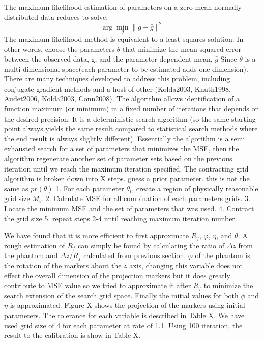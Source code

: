 The maximum-likelihood estimation of parameters on a zero mean normally distributed data reduces to solve:
\begin{equation}
\arg\min_{\theta} \| g - \bar{g} \|^2
\end{equation}
The  maximum-likelihood method is equivalent to a least-squares solution.
In other words, choose the parameters $\theta$ that minimize the mean-squared error between the observed data, g, and the parameter-dependent mean, $\bar{g}$
Since $\theta$ is a multi-dimensional space(each parameter to be estimated adds one dimension).  There are many techniques developed to address this problem, including conjugate gradient methods and a host of other (Kolda2003, Knuth1998, Audet2006, Kolda2003, Conn2008).  The algorithm allows identification of a function maximum (or minimum) in a fixed number of iterations that depends on the desired precision.  It is a deterministic search algorithm (so the same starting point always yields the same result compared to statistical search methods where the end result is always slightly different).  Essentially the algorithm is a semi exhausted search for a set of parameters that minimizes the MSE, then the algorithm regenerate another set of parameter sets based on the previous iteration until we reach the maximum iteration specified. The contracting grid algorithm is broken down into X steps.
guess a prior parameter. this is not the same as $pr(\theta)$
1. For each parameter $\theta_i$, create  a region of physically reasonable grid size $M_i$.
2. Calculate MSE for all combination of each parameters grids.
3. Locate the minimum MSE and the set of parameters that was used.
4. Contract the grid size
5. repeat steps 2-4 until reaching maximum iteration number.

We have found that it is more efficient to first approximate $R_f$, $\varphi$, $\eta$, and $\theta$.  A rough estimation of $R_f$ can simply be found by calculating the ratio of $\Delta z$ from the phantom and $\Delta z/R_f$ calculated from previous section.  $\varphi$ of the phantom is the rotation of the markers about the $z$ axis, changing this variable does not effect the overall dimension of the projection markers but it does greatly contribute to MSE value so we tried to approximate it after $R_f$ to minimize the search extension of the search grid space.  Finally the initial values for both $\phi$ and $\eta$ is approximated.  Figure X shows the projection of the markers using initial parameters.  The tolerance for each variable is described in Table X.  We have used grid size of 4 for each parameter at rate of 1.1.  Using 100 iteration, the result to the calibration is show in Table X.

